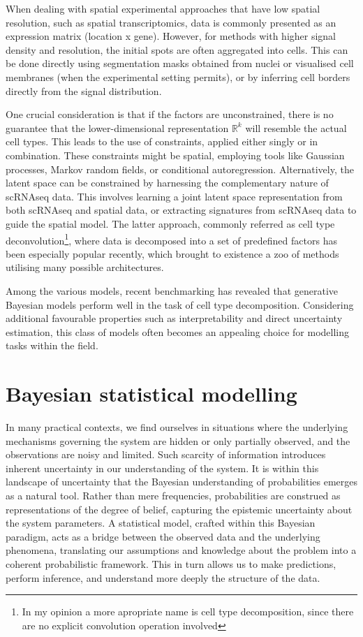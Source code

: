 When dealing with spatial experimental approaches that have low spatial resolution, such as spatial transcriptomics, data is commonly presented as an expression matrix (location x gene). However, for methods with higher signal density and resolution, the initial spots are often aggregated into cells. This can be done directly using segmentation masks obtained from nuclei or visualised cell membranes (when the experimental setting permits), or by inferring cell borders directly from the signal distribution.

One crucial consideration is that if the factors are unconstrained, there is no guarantee that the lower-dimensional representation  $\mathbb{R}^k$ will resemble the actual cell types. This leads to the use of constraints, applied either singly or in combination. These constraints might be spatial, employing tools like Gaussian processes, Markov random fields, or conditional autoregression. Alternatively, the latent space can be constrained by harnessing the complementary nature of scRNAseq data. This involves learning a joint latent space representation from both scRNAseq and spatial data, or extracting signatures from scRNAseq data to guide the spatial model. The latter approach, commonly referred as cell type deconvolution\footnote{In my opinion a more apropriate name is cell type decomposition, since there are no explicit convolution operation involved}, where data is decomposed into a set of predefined factors has been especially popular recently, which brought to existence a zoo of methods utilising many possible architectures.

Among the various models, recent benchmarking has revealed that generative Bayesian models perform well in the task of cell type decomposition. Considering additional favourable properties such as interpretability and direct uncertainty estimation, this class of models often becomes an appealing choice for modelling tasks within the field.

\section{Bayesian statistical modelling}

In many practical contexts, we find ourselves in situations where the underlying mechanisms governing the system are hidden or only partially observed, and the observations are noisy and limited. Such scarcity of information introduces inherent uncertainty in our understanding of the system. It is within this landscape of uncertainty that the Bayesian understanding of probabilities emerges as a natural tool. Rather than mere frequencies, probabilities are construed as representations of the degree of belief, capturing the epistemic uncertainty about the system parameters. A statistical model, crafted within this Bayesian paradigm, acts as a bridge between the observed data and the underlying phenomena, translating our assumptions and knowledge about the problem into a coherent probabilistic framework. This in turn allows us to make predictions, perform inference, and understand more deeply the structure of the data.


